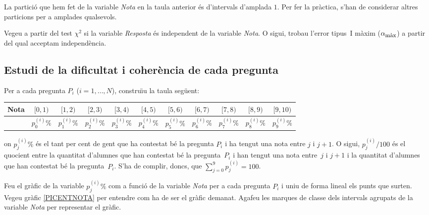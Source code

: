 La partici\'o que hem fet de la variable 
{\it Nota} en la taula anterior \'es d'intervals d'amplada $1$. 
Per fer la pr\`actica, s'han de considerar altres particions 
per a amplades qualsevols.

Vegeu a partir del test $\chi^2$ si la variable {\it Resposta}
\'es independent de la variable {\it Nota}. O sigui, 
trobau l'error tipus~I m\`axim ($\alpha_{\mbox{\footnotesize m\`ax}}$) 
a partir del qual acceptam independ\`encia.


\subsection{Estudi de la dificultat i 
coher\`encia de cada pregunta}

Per a cada pregunta $P_i$ ($i=1,\ldots,N$), constru\"{\i}u la 
taula seg\"uent:

\begin{center}
\begin{tabular}{|c||c@{}c@{}c@{}c@{}c@{}c@{}c@{}c@{}c@{}c@{}|}
\hline
Nota&$[0,1)$&$[1,2)$&$[2,3)$&$[3,4)$&$[4,5)$&$[5,6)$&$[6,7)$&$[7,8)$&$[8,9)$&$[9,10)$\\\hline\hline
&$p_0^{(i)}\%$& $p_1^{(i)}\%$&$p_2^{(i)}\%$&$p_3^{(i)}\%$&$p_4^{(i)}\%$&$p_5^{(i)}\%$&$p_6^{(i)}\%$&$p_7^{(i)}\%$&$p_8^{(i)}\%$&$p_9^{(i)}\%$\\\hline
\end{tabular}
\end{center}
on $p_j^{(i)}\%$ \'es el tant per cent de gent que ha contestat b\'e
la pregunta $P_i$ i ha tengut una nota entre $j$ i $j+1$. O sigui, 
$p_j^{(i)}/100$ \'es el quocient entre la quantitat d'alumnes que han
contestat b\'e la pregunta~$P_i$ i han tengut una nota entre~$j$ i
$j+1$ i la quantitat d'alumnes que han contestat b\'e la
pregunta~$P_i$. S'ha de complir, doncs, que $\sum\limits_{j=0}^9 
p_j^{(i)} =100$.

Feu el gr\`afic de la variable $p_j^{(i)}\%$ com a funci\'o de la 
variable {\it Nota} per a cada pregunta $P_i$ i uniu de forma lineal
els punts que surten. Vegeu gr\`afic
\ref{PICENTNOTA} per entendre com ha de ser el gr\`afic demanat.
Agafeu les marques de classe dels 
intervals agrupats de la variable
{\it Nota} per representar el gr\`afic.

